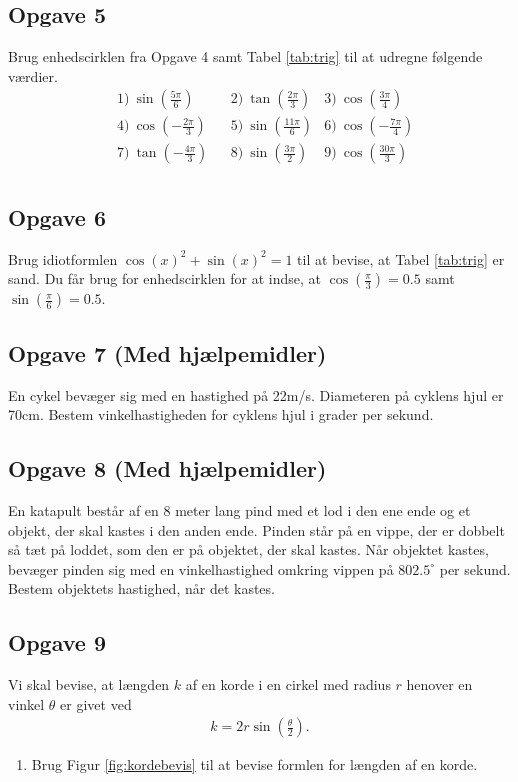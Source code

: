 \subsection*{Opgave 5}
Brug enhedscirklen fra Opgave 4 samt Tabel \ref{tab:trig} til at udregne følgende værdier.
\begin{align*}
	&1) \ \sin\left(\frac{5\pi}{6}\right) &   &2) \  \tan\left(\frac{2\pi}{3}\right)   
	 &3) \ \cos\left(\frac{3\pi}{4}\right)   \\
	&4) \ \cos\left(-\frac{2\pi}{3}\right)  &   &5) \ \sin\left(\frac{11\pi}{6}\right) 
	   &6) \ \cos\left(-\frac{7\pi}{4}\right)   \\
	&7) \   \tan\left(-\frac{4\pi}{3}\right) &  &8) \  \sin\left(\frac{3\pi}{2}\right)  
	 &9) \ \cos\left(\frac{30\pi}{3}\right)   \\	
\end{align*}

\subsection*{Opgave 6}
Brug idiotformlen $\cos(x)^2 + \sin(x)^2 = 1$ til at bevise, at Tabel \ref{tab:trig} er sand. Du får brug for enhedscirklen for at indse, at $\cos\left(\frac{\pi}{3}\right) = 0.5$ samt $\sin\left(\frac{\pi}{6}\right) = 0.5$.

\subsection*{Opgave 7 (Med hjælpemidler)}
En cykel bevæger sig med en hastighed på 22m/s. Diameteren på cyklens hjul er 70cm. Bestem vinkelhastigheden for cyklens hjul i grader per sekund. 

\subsection*{Opgave 8 (Med hjælpemidler)} 
En katapult består af en 8 meter lang pind med et lod i den ene ende og et objekt, der skal kastes i den anden ende. Pinden står på en vippe, der er dobbelt så tæt på loddet, som den er på objektet, der skal kastes. Når objektet kastes, bevæger pinden sig med en vinkelhastighed omkring vippen på $802.5^\circ$ per sekund. Bestem objektets hastighed, når det kastes.
\subsection*{Opgave 9}
Vi skal bevise, at længden $k$ af en korde i en cirkel med radius $r$ henover en vinkel $\theta$ er givet ved
\begin{align*}
	k = 2r\sin\left(\frac{\theta}{2}\right).
\end{align*}
\begin{enumerate}[label=\roman*)]
	\item Brug Figur \ref{fig:kordebevis} til at bevise formlen for længden af en korde.
\end{enumerate}


